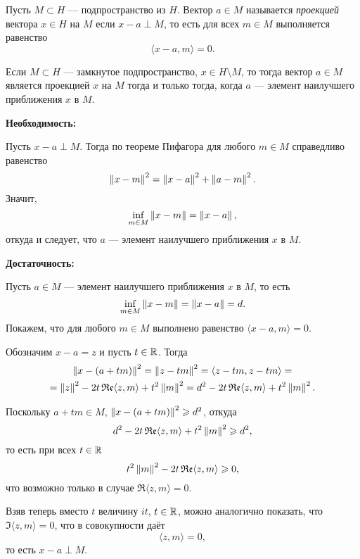 \begin{definition}
    Пусть $M \subset H$ --- подпространство из $H$. Вектор $a \in M$ называется
    \emph{проекцией} вектора $x \in H$ на $M$ если $x - a \perp M$, то есть для всех $m
    \in M$ выполняется равенство
    \[ \langle x - a, m \rangle = 0. \]
\end{definition}

\begin{theorem}\label{th:projection}
    Если $M \subset H$ --- замкнутое подпространство, $x \in H \setminus M$,
    то тогда вектор $a \in M$ является проекцией $x$ на $M$ тогда и только тогда, 
    когда $a$ --- элемент наилучшего приближения $x$ в $M$.
\end{theorem}

\begin{proofbreak}
    \dindent \textbf{Необходимость:}

    Пусть $x - a \perp M$. Тогда по теореме Пифагора для любого $m \in M$
    справедливо равенство
    \[ \left\|x - m\right\|^2 = \left\|x - a\right\|^2 + \left\|a - m\right\|^2. \]
    Значит,
    \[ \inf_{m \in M} \left\|x - m\right\| = \left\|x - a\right\|,\]
    откуда и следует, что $a$ --- элемент наилучшего приближения $x$ в $M$.

    \textbf{Достаточность:}

    Пусть $a \in M$ --- элемент наилучшего приближения $x$ в $M$, то есть
    \[ \inf_{m \in M} \left\|x - m\right\| = \left\|x - a\right\| = d.\]
    Покажем, что для любого $m \in M$ выполнено равенство $\langle x - a, m
    \rangle = 0$.

    Обозначим $x - a = z$ и пусть $t \in \mathbb{R}$. Тогда
    \begin{multline*}
        \left\|x - (a + tm)\right\|^2 = \left\|z - tm\right\|^2 = \langle z - tm, z - tm \rangle
        = \\ = \left\|z\right\|^2 - 2 t \operatorname{\mathfrak{Re}} \langle z, m \rangle + t^2 \left\|m\right\|^2 = d^2
        - 2 t \operatorname{\mathfrak{Re}} \langle z, m \rangle + t^2 \left\|m\right\|^2.
    \end{multline*}

    Поскольку $a + tm \in M$, $\left\|x - (a+tm)\right\|^2 \geqslant d^2$, откуда
    \[ d^2 - 2 t \operatorname{\mathfrak{Re}} \langle z, m \rangle + t^2 \left\|m\right\|^2 \geqslant d^2, \]
    то есть при всех $t \in \mathbb{R}$
    \[ t^2 \left\|m\right\|^2 - 2 t \operatorname{\mathfrak{Re}} \langle z, m \rangle \geqslant 0, \]
    что возможно только в случае $\Re \langle z, m \rangle = 0$. 
    
    Взяв теперь вместо $t$ величину $it$, $t \in \mathbb{R}$, можно аналогично
    показать, что $\Im \langle z, m \rangle = 0$, что в совокупности даёт
    \[ \langle z, m \rangle = 0, \]
    то есть $x - a \perp M$.
\end{proofbreak}

